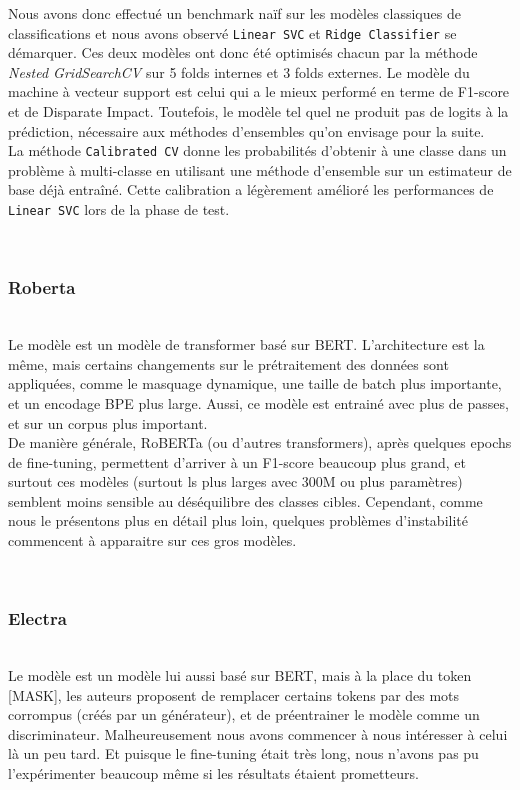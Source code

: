 Nous avons donc effectué un benchmark naïf sur les modèles classiques de classifications et nous avons observé \texttt{Linear SVC} et \texttt{Ridge Classifier} se démarquer. Ces deux modèles ont donc été optimisés chacun par la méthode \textit{Nested GridSearchCV} sur \textsf{5} folds internes et \textsf{3} folds externes. Le modèle du machine à vecteur support est celui qui a le mieux performé en terme de F1-score et de Disparate Impact. Toutefois, le modèle tel quel ne produit pas de logits à la prédiction, nécessaire aux méthodes d'ensembles qu'on envisage pour la suite.\\
La méthode \texttt{Calibrated CV} donne les probabilités d'obtenir à une classe dans un problème à multi-classe en utilisant une méthode d'ensemble sur un estimateur de base déjà entraîné. Cette calibration a légèrement amélioré les performances de \texttt{Linear SVC} lors de la phase de test.

\hfill\\
\subsubsection{Roberta}
\hfill\\

Le modèle  est un modèle de transformer basé sur BERT. L'architecture est la même, mais certains changements sur le prétraitement des données sont appliquées, comme le masquage dynamique, une taille de batch plus importante, et un encodage BPE plus large. Aussi, ce modèle est entrainé avec plus de passes, et sur un corpus plus important. \\
De manière générale, RoBERTa (ou d'autres transformers), après quelques epochs de fine-tuning, permettent d'arriver à un F1-score beaucoup plus grand, et surtout ces modèles (surtout ls plus larges avec 300M ou plus paramètres) semblent moins sensible au déséquilibre des classes cibles. Cependant, comme nous le présentons plus en détail plus loin, quelques problèmes d'instabilité commencent à apparaitre sur ces gros modèles.

\hfill\\
\subsubsection{Electra}
\hfill\\

Le modèle   est un modèle lui aussi basé sur BERT, mais à la place du token [MASK], les auteurs proposent de remplacer certains tokens par des mots corrompus (créés par un générateur), et de préentrainer le modèle comme un discriminateur. Malheureusement nous avons commencer à nous intéresser à celui là un peu tard. Et puisque le fine-tuning était très long, nous n'avons pas pu l'expérimenter beaucoup même si les résultats étaient prometteurs.

